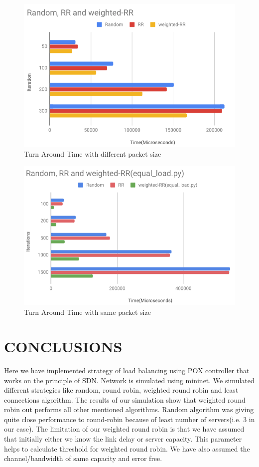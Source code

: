 \documentclass[letterpaper, 10 pt, conference]{IEEEtran}
\begin{document}
\begin{figure}[ht!]
\centering
\includegraphics[width=\linewidth]{4.png}
\caption{Turn Around Time with different packet size \label{fig:8}}
\end{figure}


\begin{figure}[ht!]
\centering
\includegraphics[width=\linewidth]{6.png}
\caption{Turn Around Time with same packet size \label{fig:10}}
\end{figure}

\section{CONCLUSIONS}
\label{sec:conclusion}

Here we have implemented strategy of load balancing using POX controller that works on the principle of SDN. Network is simulated using mininet. We simulated different strategies like random, round robin, weighted round robin and least connections algorithm. The results of our simulation show that weighted round robin out performs all other mentioned algorithms. Random algorithm was giving quite close performance to round-robin because of least number of servers(i.e. 3 in our case). The limitation of our weighted round robin is that we have assumed that initially either we know the link delay or server capacity. This parameter helps to calculate threshold for weighted round robin. We have also assumed the channel/bandwidth of same capacity and error free.
\end{document}
